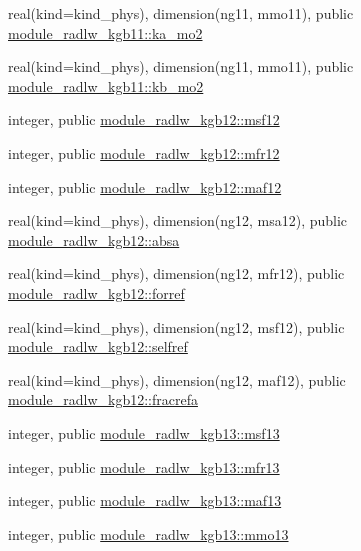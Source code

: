 \begin{DoxyCompactItemize}
\item 
real(kind=kind\+\_\+phys), dimension(ng11, mmo11), public \hyperlink{group__module__radlw__main_ga8791eb290525c0d08fefa33ca23569c8}{module\+\_\+radlw\+\_\+kgb11\+::ka\+\_\+mo2}
\item 
real(kind=kind\+\_\+phys), dimension(ng11, mmo11), public \hyperlink{group__module__radlw__main_gaebc48e152bb90794b6d0b426f6c5f9e4}{module\+\_\+radlw\+\_\+kgb11\+::kb\+\_\+mo2}
\item 
integer, public \hyperlink{group__module__radlw__main_ga3282a15ee0faaafd65509536a59e5b4f}{module\+\_\+radlw\+\_\+kgb12\+::msf12}
\item 
integer, public \hyperlink{group__module__radlw__main_gacd751a2e48d0286e3d25a9b658a8367a}{module\+\_\+radlw\+\_\+kgb12\+::mfr12}
\item 
integer, public \hyperlink{group__module__radlw__main_ga9d7c05182e21605108bd65f47bb5569c}{module\+\_\+radlw\+\_\+kgb12\+::maf12}
\item 
real(kind=kind\+\_\+phys), dimension(ng12, msa12), public \hyperlink{group__module__radlw__main_ga7600bfa19dde3b47d8479f5766ee0c93}{module\+\_\+radlw\+\_\+kgb12\+::absa}
\item 
real(kind=kind\+\_\+phys), dimension(ng12, mfr12), public \hyperlink{group__module__radlw__main_ga97dac0d0e010441171e09e317e5aeee8}{module\+\_\+radlw\+\_\+kgb12\+::forref}
\item 
real(kind=kind\+\_\+phys), dimension(ng12, msf12), public \hyperlink{group__module__radlw__main_ga8aaf83ec7a08a244fd1e5396c9fd9b1d}{module\+\_\+radlw\+\_\+kgb12\+::selfref}
\item 
real(kind=kind\+\_\+phys), dimension(ng12, maf12), public \hyperlink{group__module__radlw__main_ga58ff4f54c11eb12f7ab5157823981b16}{module\+\_\+radlw\+\_\+kgb12\+::fracrefa}
\item 
integer, public \hyperlink{group__module__radlw__main_ga7f88590d2a9fc392b04e89fd3d4bf2bf}{module\+\_\+radlw\+\_\+kgb13\+::msf13}
\item 
integer, public \hyperlink{group__module__radlw__main_ga158782c955af9f50aaefea2d49af97ce}{module\+\_\+radlw\+\_\+kgb13\+::mfr13}
\item 
integer, public \hyperlink{group__module__radlw__main_ga1ddc025df872b12194b8c6344cc0204e}{module\+\_\+radlw\+\_\+kgb13\+::maf13}
\item 
integer, public \hyperlink{group__module__radlw__main_gae513ce55829a57a0dbda77f570e4a619}{module\+\_\+radlw\+\_\+kgb13\+::mmo13}
\item 

\end{DoxyCompactItemize}
